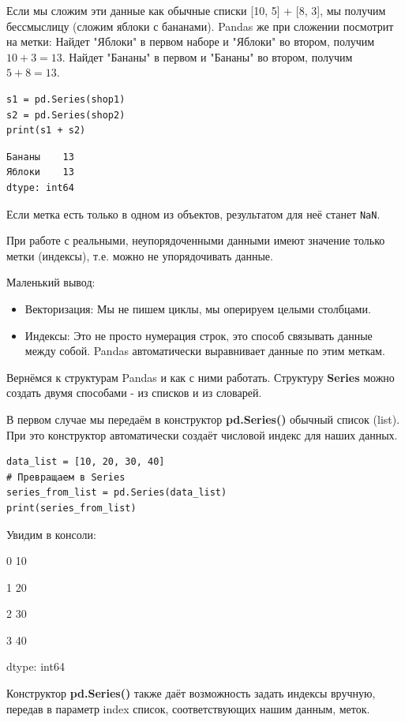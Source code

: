 \documentclass[pract]{SCWorks}
\begin{document}
Если мы сложим эти данные как обычные списки [10, 5] + [8, 3], мы получим бессмыслицу 
(сложим яблоки с бананами). Pandas же при сложении посмотрит на метки:
Найдет "Яблоки" в первом наборе и "Яблоки" во втором, получим $10+3=13$.
Найдет "Бананы" в первом и "Бананы" во втором, получим $5+8=13$.

\begin{verbatim}
s1 = pd.Series(shop1)
s2 = pd.Series(shop2)
print(s1 + s2)
\end{verbatim}

\begin{verbatim}
Бананы    13
Яблоки    13
dtype: int64
\end{verbatim}

Если метка есть только в одном из объектов, результатом для неё станет \texttt{NaN}.

При работе с реальными, неупорядоченными данными имеют значение только метки (индексы), т.е. 
можно не упорядочивать данные.

Маленький вывод:

\begin{itemize}
    \item Векторизация: Мы не пишем циклы, мы оперируем целыми столбцами.
    \item Индексы: Это не просто нумерация строк, это способ связывать данные между собой. 
    Pandas автоматически выравнивает данные по этим меткам.
\end{itemize}

Вернёмся к структурам Pandas и как с ними работать.
Структуру \textbf{Series} можно создать двумя способами - из списков и из словарей.

В первом случае мы передаём в конструктор \textbf{pd.Series()} обычный список (list). При это 
конструктор автоматически создаёт числовой индекс для наших данных.

\begin{verbatim}
data_list = [10, 20, 30, 40]
# Превращаем в Series
series_from_list = pd.Series(data_list)
print(series_from_list)
\end{verbatim}
Увидим в консоли:

0   10

1   20

2   30

3   40

dtype: int64

Конструктор \textbf{pd.Series()} также даёт возможность задать индексы вручную, передав в параметр index
список, соответствующих нашим данным, меток.
\end{document}
